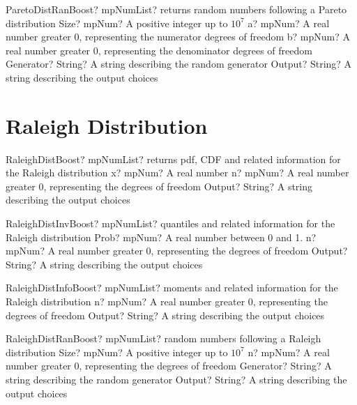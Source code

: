 \documentclass[12pt,a4paper,openany]{book}
\begin{document}
\begin{mpFunctionsExtract}
\mpFunctionFive
{ParetoDistRanBoost? mpNumList? returns random numbers following a Pareto distribution}
{Size? mpNum? A positive integer up to $10^7$}
{a? mpNum? A real number greater 0, representing the numerator  degrees of freedom}
{b? mpNum? A real number greater 0, representing the denominator degrees of freedom}
{Generator? String? A string describing the random generator}
{Output? String? A string describing the output choices}
\end{mpFunctionsExtract}

\section{Raleigh Distribution}

\begin{mpFunctionsExtract}
\mpFunctionThree
{RaleighDistBoost? mpNumList? returns pdf, CDF and related information for the Raleigh distribution}
{x? mpNum? A real number}
{n? mpNum? A real number greater 0, representing the degrees of freedom}
{Output? String? A string describing the output choices}
\end{mpFunctionsExtract}

\begin{mpFunctionsExtract}
\mpFunctionThree
{RaleighDistInvBoost? mpNumList? quantiles and related information for the Raleigh distribution}
{Prob? mpNum? A real number between 0 and 1.}
{n? mpNum? A real number greater 0, representing the degrees of freedom}
{Output? String? A string describing the output choices}
\end{mpFunctionsExtract}

\begin{mpFunctionsExtract}
\mpFunctionTwo
{RaleighDistInfoBoost? mpNumList? moments and related information for the Raleigh distribution}
{n? mpNum? A real number greater 0, representing the degrees of freedom}
{Output? String? A string describing the output choices}
\end{mpFunctionsExtract}

\begin{mpFunctionsExtract}
\mpFunctionFour
{RaleighDistRanBoost? mpNumList? random numbers following a Raleigh distribution}
{Size? mpNum? A positive integer up to $10^7$}
{n? mpNum? A real number greater 0, representing the degrees of freedom}
{Generator? String? A string describing the random generator}
{Output? String? A string describing the output choices}
\end{mpFunctionsExtract}
\end{document}
